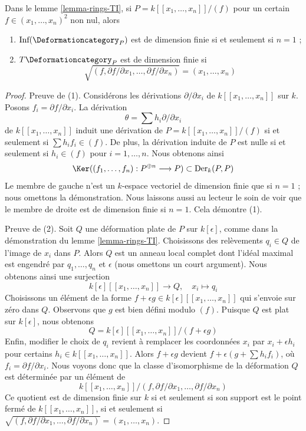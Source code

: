 \begin{lemma}
\label{lemma-power-series-rings-TI}
Dans le lemme \ref{lemma-rings-TI}, si $P = k[[x_1, \ldots, x_n]]/(f)$
pour un certain $f \in (x_1, \ldots, x_n)^2$ non nul, alors
\begin{enumerate}
\item $\text{Inf}(\Deformationcategory_P)$ est de dimension finie
si et seulement si $n = 1$ ;
\item $T\Deformationcategory_P$ est de dimension finie si
$$
\sqrt{(f, \partial f/\partial x_1, \ldots,  \partial f/\partial x_n)} =
(x_1, \ldots, x_n)
$$
\end{enumerate}
\end{lemma}

\begin{proof}
Preuve de (1). Considérons les dérivations $\partial/\partial x_i$ de
$k[[x_1, \ldots, x_n]]$ sur $k$. Posons $f_i = \partial f/\partial x_i$.
La dérivation
$$
\theta = \sum h_i \partial/\partial x_i
$$
de $k[[x_1, \ldots, x_n]]$
induit une dérivation de $P = k[[x_1, \ldots, x_n]]/(f)$
si et seulement si
$\sum h_i f_i \in (f)$. De plus, la dérivation induite de $P$
est nulle si et seulement si $h_i \in (f)$ pour $i = 1, \ldots, n$.
Nous obtenons ainsi
$$
\Ker((f_1, \ldots, f_n) : P^{\oplus n} \longrightarrow P) \subset
\text{Der}_k(P, P)
$$
Le membre de gauche n'est un $k$-espace vectoriel de dimension finie que si
$n = 1$ ; nous omettons la démonstration. Nous laissons aussi au lecteur le soin de voir
que le membre de droite est de dimension finie si $n = 1$.
Cela démontre (1).

\medskip\noindent
Preuve de (2). Soit $Q$ une déformation plate de $P$ sur $k[\epsilon]$,
comme dans la démonstration du lemme \ref{lemma-rings-TI}. Choisissons des relèvements $q_i \in Q$
de l'image de $x_i$ dans $P$. Alors $Q$ est un anneau local complet
dont l'idéal maximal est engendré par $q_1, \ldots, q_n$ et $\epsilon$
(nous omettons un court argument). Nous obtenons ainsi une surjection
$$
k[\epsilon][[x_1, \ldots, x_n]] \longrightarrow Q,\quad
x_i \longmapsto q_i
$$
Choisissons un élément de la forme
$f + \epsilon g \in k[\epsilon][[x_1, \ldots, x_n]]$
qui s'envoie sur zéro dans $Q$. Observons que $g$ est bien défini modulo $(f)$.
Puisque $Q$ est plat sur $k[\epsilon]$, nous obtenons
$$
Q = k[\epsilon][[x_1, \ldots, x_n]]/(f + \epsilon g)
$$
Enfin, modifier le choix de $q_i$ revient à
remplacer les coordonnées $x_i$ par $x_i + \epsilon h_i$
pour certains $h_i \in k[[x_1, \ldots, x_n]]$. Alors
$f + \epsilon g$ devient $f + \epsilon (g + \sum h_i f_i)$,
où $f_i = \partial f/\partial x_i$. Nous voyons donc que la
classe d'isomorphisme de la déformation $Q$ est déterminée
par un élément de
$$
k[[x_1, \ldots, x_n]]/
(f, \partial f/\partial x_1, \ldots,  \partial f/\partial x_n)
$$
Ce quotient est de dimension finie sur $k$ si et seulement si
son support est le point fermé de $k[[x_1, \ldots, x_n]]$,
si et seulement si
$\sqrt{(f, \partial f/\partial x_1, \ldots,  \partial f/\partial x_n)} =
(x_1, \ldots, x_n)$.
\end{proof}






